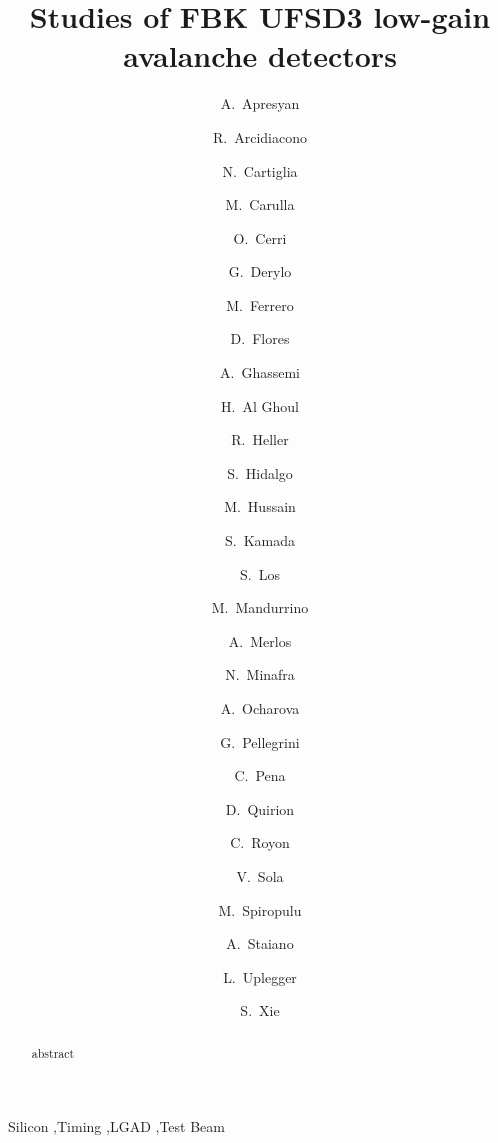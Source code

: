 \documentclass[preprint,1p]{elsarticle}
\begin{document}
\linenumbers

\begin{frontmatter}



\title{Studies of FBK UFSD3 low-gain avalanche detectors}


\author[1]{A.~Apresyan}
\author[5,7]{R.~Arcidiacono}
\author[5]{N.~Cartiglia}
\author[8]{M.~Carulla}
\author[2]{O.~Cerri}
\author[1]{G.~Derylo}
\author[5]{M.~Ferrero}
\author[8]{D.~Flores}
\author[9]{A.~Ghassemi}
\author[3]{H.~Al Ghoul}
\author[1]{R.~Heller}
\author[8]{S.~Hidalgo}
\author[1]{M.~Hussain}
\author[9]{S.~Kamada}
\author[1]{S.~Los}
\author[5]{M.~Mandurrino}
\author[8]{A.~Merlos}
\author[3]{N.~Minafra}
\author[4]{A.~Ocharova}
\author[8]{G.~Pellegrini}
\author[1,2]{C.~Pena}
\author[8]{D.~Quirion}
\author[3]{C.~Royon}
\author[5]{V.~Sola}
\author[2]{M.~Spiropulu}
\author[5]{A.~Staiano}
\author[1]{L.~Uplegger}
\author[2]{S.~Xie}

\address[1]{Fermi National Accelerator Laboratory, Batavia, IL, USA}
\address[2]{California Institute of Technology, Pasadena, CA, USA}
\address[3]{University of Kansas, KS, USA}
\address[4]{University of California Santa Barabara, CA, USA}
\address[5]{INFN, Torino, Italy}
\address[6]{Universit\`a di Torino, Torino, Italy}
\address[7]{Universit\`a del Piemonte Orientale, Italy}
\address[8]{Centro Nacional de Microelectr\'{o}nica (IMB-CNM-CSIC), Barcelona, Spain}

\begin{abstract}
abstract
\end{abstract}

\begin{keyword}

Silicon \sep Timing \sep LGAD \sep Test Beam

\end{keyword}

\end{frontmatter}
\end{document}
